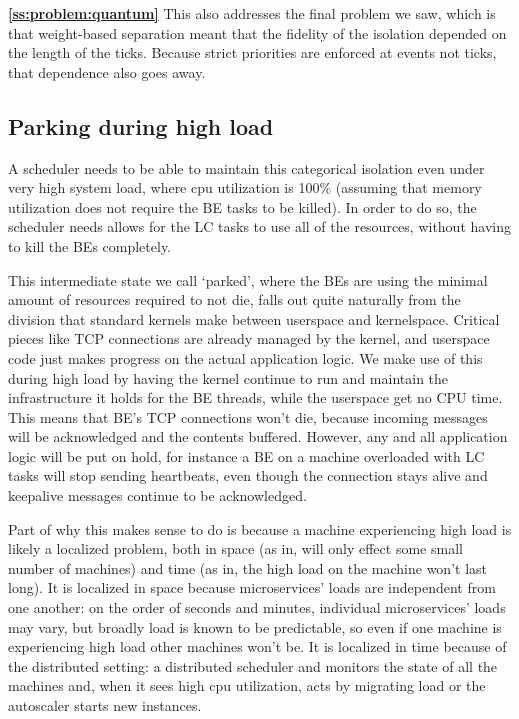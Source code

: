 \textbf{\autoref{ss:problem:quantum}} This also addresses the final problem we
saw, which is that weight-based separation meant that the fidelity of the
isolation depended on the length of the ticks. Because strict priorities are
enforced at events not ticks, that dependence also goes away.

\subsection{Parking during high load}\label{ss:approach:parking}

A scheduler needs to be able to maintain this categorical isolation even under
very high system load, where cpu utilization is 100\% (assuming that memory
utilization does not require the BE tasks to be killed). In order to do so, the scheduler needs allows for the LC tasks
to use all of the resources, without having to kill the BEs completely.

This intermediate state we call `parked', where the BEs are using the minimal
amount of resources required to not die, falls out quite naturally from the
division that standard kernels make between userspace and kernelspace. Critical
pieces like TCP connections  are already managed by the kernel,
and userspace code just makes progress on the actual application logic. We make
use of this during high load by having the kernel continue to run and maintain
the infrastructure it holds for the BE threads, while the userspace get no CPU
time. This means that BE's TCP connections won't die, because incoming messages
will be acknowledged and the contents buffered. However, any and all application
logic will be put on hold, for instance a BE on a machine overloaded with LC
tasks will stop sending heartbeats, even though the connection stays alive and
keepalive messages continue to be acknowledged.

Part of why this makes sense to do is because a machine experiencing high load
is likely a localized problem, both in space (as in, will only effect some small
number of machines) and time (as in, the high load on the machine won't last
long). It is localized in space because microservices' loads are independent
from one another: on the order of seconds and minutes, individual microservices'
loads may vary, but broadly load is known to be predictable, so even if one
machine is experiencing high load other machines won't be. It is localized in
time because of the distributed setting: a distributed scheduler and monitors
the state of all the machines and, when it sees high cpu utilization, acts by
migrating load or the autoscaler starts new instances.